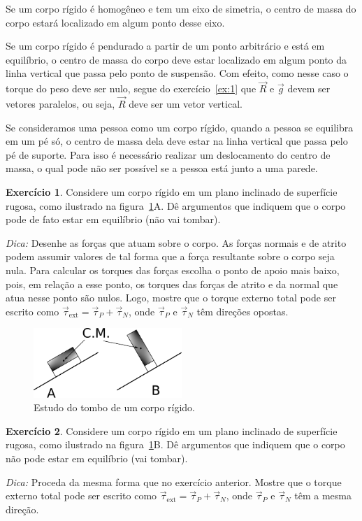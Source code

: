 \documentclass[12pt,a4paper]{article}
\theoremstyle{definition}
\newtheorem{ex}{Exercício}[section]
\begin{document}
Se um corpo rígido é homogêneo e tem um eixo de simetria, o centro de
massa do corpo estará localizado em algum ponto desse eixo.

Se um corpo rígido é pendurado a partir de um ponto arbitrário e está
em equilíbrio, o centro de massa do corpo deve estar localizado em
algum ponto da linha vertical que passa pelo ponto de suspensão. Com
efeito, como nesse caso o torque do peso deve ser nulo, segue do
exercício~\ref{ex:1} que $\vec R$ e $\vec g$ devem ser vetores
paralelos, ou seja, $\vec R$ deve ser um vetor vertical.

Se consideramos uma pessoa como um corpo rígido, quando a pessoa se
equilibra em um pé só, o centro de massa dela deve estar na linha
vertical que passa pelo pé de suporte. Para isso é necessário realizar
um deslocamento do centro de massa, o qual pode não ser possível se a
pessoa está junto a uma parede.

\begin{ex}
  Considere um corpo rígido em um plano inclinado de superfície
  rugosa, como ilustrado na figura~\ref{fig:tombo}A. Dê argumentos que
  indiquem que o corpo pode de fato estar em equilíbrio (não vai
  tombar).

  \noindent\textit{Dica:} Desenhe as forças que atuam sobre o
  corpo. As forças normais e de atrito podem assumir valores de tal
  forma que a força resultante sobre o corpo seja nula. Para calcular
  os torques das forças escolha o ponto de apoio mais baixo, pois, em
  relação a esse ponto, os torques das forças de atrito e da normal
  que atua nesse ponto são nulos. Logo, mostre que o torque externo
  total pode ser escrito como
  $\vec \tau_{\mathrm{ext}}=\vec\tau_P+\vec\tau_N$, onde $\vec\tau_P$
  e $\vec\tau_N$ têm direções opostas.
  \begin{figure}[t]
    \centering
    \includegraphics[width=0.5\textwidth,keepaspectratio]{aux/tombo.pdf}
    \caption{Estudo do tombo de um corpo rígido.}
    \label{fig:tombo}
  \end{figure}
\end{ex}

\begin{ex}
  Considere um corpo rígido em um plano inclinado de superfície
  rugosa, como ilustrado na figura~\ref{fig:tombo}B. Dê argumentos que
  indiquem que o corpo não pode estar em equilíbrio (vai tombar).

  \noindent\textit{Dica:} Proceda da mesma forma que no exercício
  anterior. Mostre que o torque externo total pode ser escrito como
  $\vec\tau_{\mathrm{ext}}=\vec\tau_P+\vec\tau_N$, onde $\vec\tau_P$ e
  $\vec\tau_N$ têm a mesma direção.
\end{ex}
\end{document}
